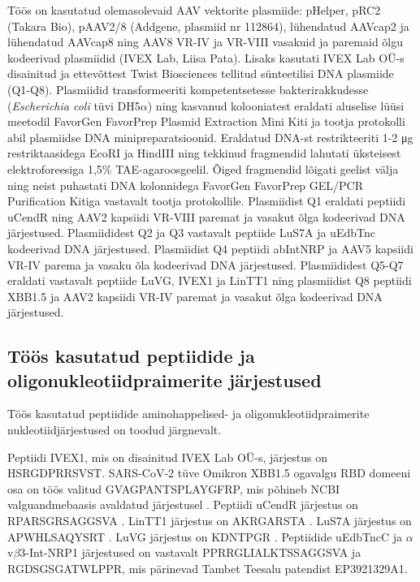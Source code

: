 \documentclass{trkut}%
\begin{document}
Töös on kasutatud olemasolevaid AAV vektorite plasmiide: pHelper, pRC2 (Takara Bio), pAAV2/8 (Addgene, plasmiid nr 112864), lühendatud AAVcap2 ja lühendatud AAVcap8 ning AAV8 VR-IV ja VR-VIII vasakuid ja paremaid õlgu kodeerivad plasmiidid (IVEX Lab, Liisa Pata). Lisaks kasutati IVEX Lab OÜ-s disainitud ja ettevõttest Twist Biosciences tellitud sünteetilisi DNA plasmiide (Q1-Q8). Plasmiidid transformeeriti kompetentsetesse bakterirakkudesse (\textit{Escherichia coli} tüvi DH5$\alpha$) ning kasvanud kolooniatest eraldati aluselise lüüsi meetodil FavorGen FavorPrep Plasmid Extraction Mini Kiti ja tootja protokolli abil plasmiidse DNA minipreparatsioonid. Eraldatud DNA-st restrikteeriti 1-2 \si{\micro\gram} restriktaasidega EcoRI ja HindIII ning tekkinud fragmendid lahutati üksteisest elektroforeesiga 1,5\% TAE-agaroosgeelil. Õiged fragmendid lõigati geelist välja ning neist puhastati DNA kolonnidega FavorGen FavorPrep GEL/PCR Purification Kitiga vastavalt tootja protokollile. Plasmiidist Q1 eraldati peptiidi uCendR ning AAV2 kapsiidi VR-VIII paremat ja vasakut õlga kodeerivad DNA järjestused. Plasmiididest Q2 ja Q3 vastavalt peptiide LuS7A ja uEdbTnc kodeerivad DNA järjestused. Plasmiidist Q4 peptiidi abIntNRP ja AAV5 kapsiidi VR-IV parema ja vasaku õla kodeerivad DNA järjestused. Plasmiididest Q5-Q7 eraldati vastavalt peptiide LuVG, IVEX1 ja LinTT1 ning plasmiidist Q8 peptiidi XBB1.5 ja AAV2 kapsiidi VR-IV paremat ja vasakut õlga kodeerivad DNA järjestused.

\subsection{Töös kasutatud peptiidide ja oligonukleotiidpraimerite järjestused}

Töös kasutatud peptiidide aminohappelised- ja oligonukleotiidpraimerite nukleotiidjärjestused on toodud järgnevalt. 

Peptiidi IVEX1, mis on disainitud IVEX Lab OÜ-s, järjestus on HSRGDPRRSVST. SARS-CoV-2 tüve Omikron XBB1.5 ogavalgu RBD domeeni osa on töös valitud GVAGPANTSPLAYGFRP, mis põhineb NCBI valguandmebaasis avaldatud järjestusel \parencite{spike}. Peptiidi uCendR järjestus on RPARSGRSAGGSVA \parencite{ucendr}. LinTT1 järjestus on AKRGARSTA \parencite{lintt1}. LuS7A järjestus on APWHLSAQYSRT \parencite{lus7a}. LuVG järjestus on KDNTPGR \parencite{luvg}. Peptiidide uEdbTncC ja $\alpha$v$\beta$3-Int-NRP1 järjestused on vastavalt PPRRGLIALKTSSAGGSVA ja RGDSGSGATWLPPR, mis pärinevad Tambet Teesalu patendist EP3921329A1.
\end{document}

